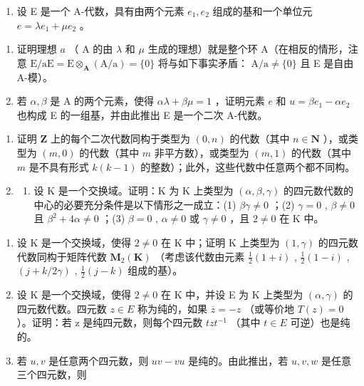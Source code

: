 \BourbakiExercisesSection

\begin{enumerate}
\def\labelenumi{\arabic{enumi}.}
\tightlist
\item
  设 E 是一个 A-代数，具有由两个元素 \(e_1, e_2\) 组成的基和一个单位元 \(e = \lambda e_1 + \mu e_2\) 。
\end{enumerate}

\begin{enumerate}
\def\labelenumi{(\alph{enumi})}
\item
  证明理想 \(a\) （ A 的由 \(\lambda\) 和 \(\mu\) 生成的理想）就是整个环 A（在相反的情形，注意 \(\mathrm{E} / \mathrm{aE} = \mathrm{E} \otimes_{\mathbf{A}} (\mathrm{A} / \mathrm{a}) = \{0\}\) 将与如下事实矛盾： \(\mathrm{A} / \mathrm{a} \neq \{0\}\) 且 E 是自由 A-模）。
\item
  若 \(\alpha, \beta\) 是 A 的两个元素，使得 \(\alpha\lambda + \beta\mu = 1\) ，证明元素 \(e\) 和 \(u = \beta e_1 - \alpha e_2\) 也构成 E 的一组基，并由此推出 E 是一个二次 A-代数。
\end{enumerate}

\begin{enumerate}
\def\labelenumi{\arabic{enumi}.}
\setcounter{enumi}{1}
\item
  证明 \(\mathbf{Z}\) 上的每个二次代数同构于类型为 \((0, n)\) 的代数（其中 \(n \in \mathbf{N}\) ），或类型为 \((m, 0)\) 的代数（其中 \(m\) 非平方数），或类型为 \((m, 1)\) 的代数（其中 \(m\) 是不具有形式 \(k(k - 1)\) 的整数）；此外，这些代数中任意两个都不同构。
\item
  \begin{enumerate}
  \def\labelenumii{(\alph{enumii})}
  \tightlist
  \item
    设 K 是一个交换域。证明：K 为 K 上类型为 \((\alpha, \beta, \gamma)\) 的四元数代数的中心的必要充分条件是以下情形之一成立：(1) \(\beta\gamma \neq 0\) ；(2) \(\gamma = 0\) , \(\beta \neq 0\) 且 \(\beta^{2} + 4\alpha \neq 0\) ；(3) \(\beta = 0\) , \(\alpha \neq 0\) 或 \(\gamma \neq 0\) ，且 \(2 \neq 0\) 在 K 中。
  \end{enumerate}
\end{enumerate}

\begin{enumerate}
\def\labelenumi{(\alph{enumi})}
\setcounter{enumi}{1}
\item
  设 K 是一个交换域，使得 \(2 \neq 0\) 在 K 中；证明 K 上类型为 \((1, \gamma)\) 的四元数代数同构于矩阵代数 \(\mathbf{M}_{2}(\mathbf{K})\) （考虑该代数由元素 \(\frac{1}{2}(1 + i)\) , \(\frac{1}{2}(1 - i)\) , \((j + k/2\gamma)\) , \(\frac{1}{2}(j - k)\) 组成的基）。
\item
  设 K 是一个交换域，使得 \(2 \neq 0\) 在 K 中，并设 E 为 K 上类型为 \((\alpha, \gamma)\) 的四元数代数。四元数 \(z \in E\) 称为纯的，如果 \(\overline{z} = -z\) （或等价地 \(T(z) = 0\) ）。证明：若 z 是纯四元数，则每个四元数 \(tzt^{-1}\) （其中 \(t \in E\) 可逆）也是纯的。
\item
  若 \(u, v\) 是任意两个四元数，则 \(uv - vu\) 是纯的。由此推出，若 \(u, v, w\) 是任意三个四元数，则
\end{enumerate}

